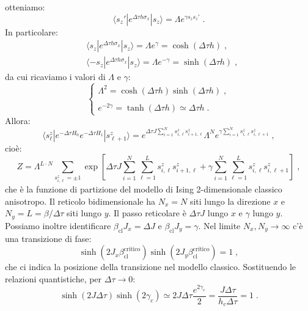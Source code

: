 \documentclass[10pt,a4paper]{report}
\theoremstyle{definition}
\numberwithin{equation}{section}
\newcommand{\bra}{\langle}
\newcommand{\ket}{\rangle}
\begin{document}
otteniamo:
\begin{equation}
\bra s_z'|e^{\Delta\tau h\sigma_x}|s_z\ket=\Lambda e^{\gamma s_zs_z'}\;.
\end{equation}
In particolare:
\begin{align*}
&\bra s_z|e^{\Delta\tau h\sigma_x}|s_z\ket=\Lambda e^{\gamma}=\cosh(\Delta\tau h)\;, \\
&\bra -s_z|e^{\Delta\tau h\sigma_x}|s_z\ket=\Lambda e^{-\gamma}=\sinh(\Delta\tau h)\;,
\end{align*}
da cui ricaviamo i valori di $\Lambda$ e $\gamma$:
\begin{equation}
\begin{cases}
\Lambda^2=\cosh(\Delta\tau h)\sinh(\Delta\tau h)\;, \\
\\
e^{-2\gamma}=\tanh(\Delta\tau h)\simeq \Delta\tau h\;.
\end{cases}
\end{equation}
Allora:
\begin{equation*}
\bra s_{\ell}^z|e^{-\Delta\tau H_0}e^{-\Delta\tau H_1}|s_{\ell+1}^z\ket=e^{\Delta\tau J\sum_{i=1}^Ns_{i,\ell}^zs_{i+1,\ell}^z}\Lambda^Ne^{\gamma\sum_{i=1}^Ns_{i,\ell}^zs_{i,\ell+1}^z}\;,
\end{equation*}
cioè:
\begin{equation}
Z=\Lambda^{L\cdot N}\sum_{s_{i,\ell}^z=\pm 1}\exp\left[\Delta\tau J\sum_{i=1}^N\sum_{\ell=1}^Ls_{i,\ell}^zs_{i+1,\ell}^z+\gamma\sum_{i=1}^N\sum_{\ell=1}^Ls_{i,\ell}^zs_{i,\ell+1}^z\right]\;,
\end{equation}
che è la funzione di partizione del modello di Ising 2-dimensionale classico anisotropo. Il reticolo bidimensionale ha $N_x=N$ siti lungo la direzione $x$ e $N_y=L=\beta/\Delta\tau$ siti lungo $y$. Il passo reticolare è $\Delta\tau J$ lungo $x$ e $\gamma$ lungo $y$. Possiamo inoltre identificare $\beta_{\mathrm{cl}}J_x=\Delta J$ e $\beta_{\mathrm{cl}}J_y=\gamma$. Nel limite $N_x,N_y\to\infty$ c'è una transizione di fase:
\begin{equation}
\sinh(2J_x\beta_{\mathrm{cl}}^{\mathrm{critico}})\sinh(2J_y\beta_{\mathrm{cl}}^{\mathrm{critico}})=1\;,
\end{equation}
che ci indica la posizione della transizione nel modello classico. Sostituendo le relazioni quantistiche, per $\Delta\tau\to 0$:
\begin{equation}
\sinh(2J\Delta\tau)\sinh(2\gamma_c)\simeq 2J\Delta\tau\frac{e^{2\gamma_c}}{2}=\frac{J\Delta\tau}{h_c\Delta\tau}=1\;.
\end{equation}
\end{document}
